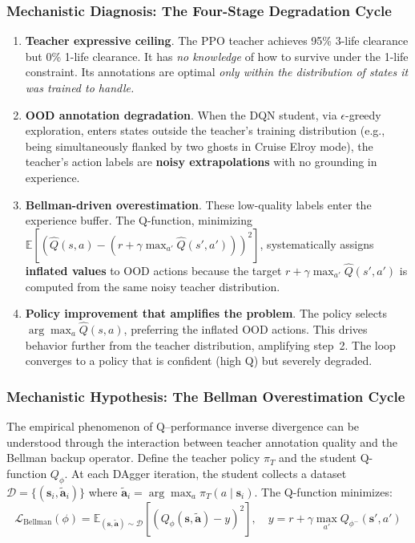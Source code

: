 \documentclass[11pt,a4paper]{article}
\theoremstyle{definition}
\begin{document}
\subsubsection{Mechanistic Diagnosis: The Four-Stage Degradation Cycle}

\begin{enumerate}[nosep]
    \item \textbf{Teacher expressive ceiling}. The PPO teacher achieves 95\% 3-life clearance but 0\% 1-life clearance. It has \textit{no knowledge} of how to survive under the 1-life constraint. Its annotations are optimal \textit{only within the distribution of states it was trained to handle.}
    \item \textbf{OOD annotation degradation}. When the DQN student, via $\epsilon$-greedy exploration, enters states outside the teacher's training distribution (e.g., being simultaneously flanked by two ghosts in Cruise Elroy mode), the teacher's action labels are \textbf{noisy extrapolations} with no grounding in experience.
    \item \textbf{Bellman-driven overestimation}. These low-quality labels enter the experience buffer. The Q-function, minimizing $\mathbb{E}[(\hat{Q}(s,a) - (r + \gamma \max_{a'} \hat{Q}(s',a')))^2]$, systematically assigns \textbf{inflated values} to OOD actions because the target $r + \gamma \max_{a'} \hat{Q}(s',a')$ is computed from the same noisy teacher distribution.
    \item \textbf{Policy improvement that amplifies the problem}. The policy selects $\arg\max_a \hat{Q}(s,a)$, preferring the inflated OOD actions. This drives behavior further from the teacher distribution, amplifying step~2. The loop converges to a policy that is confident (high Q) but severely degraded.
\end{enumerate}

\subsubsection{Mechanistic Hypothesis: The Bellman Overestimation Cycle}

The empirical phenomenon of Q--performance inverse divergence can be understood through the interaction between teacher annotation quality and the Bellman backup operator.
Define the teacher policy $\pi_T$ and the student Q-function $Q_\phi$.
At each DAgger iteration, the student collects a dataset $\mathcal{D} = \{(\mathbf{s}_i, \tilde{\mathbf{a}}_i)\}$ where $\tilde{\mathbf{a}}_i = \arg\max_a \pi_T(a \mid \mathbf{s}_i)$.
The Q-function minimizes:
\begin{equation}
\mathcal{L}_{\text{Bellman}}(\phi) = \mathbb{E}_{(\mathbf{s}, \tilde{\mathbf{a}}) \sim \mathcal{D}}\left[ \left( Q_\phi(\mathbf{s}, \tilde{\mathbf{a}}) - y \right)^2 \right],\quad y = r + \gamma \max_{a'} Q_{\phi^-}(\mathbf{s}', a')
\end{equation}
\end{document}
